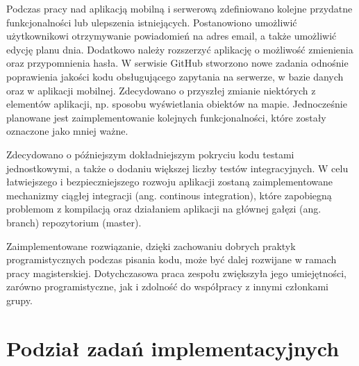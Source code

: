 \documentclass[10pt,twoside,a4paper]{report}
\begin{document}
\par Podczas pracy nad aplikacją mobilną i serwerową zdefiniowano kolejne przydatne funkcjonalności lub ulepszenia istniejących. Postanowiono umożliwić użytkownikowi otrzymywanie powiadomień na adres email, a także umożliwić edycję planu dnia. Dodatkowo należy rozszerzyć aplikację o możliwość zmienienia oraz przypomnienia hasła. W serwisie GitHub stworzono nowe zadania odnośnie poprawienia jakości kodu obsługującego zapytania na serwerze, w bazie danych oraz w aplikacji mobilnej. Zdecydowano o przyszłej zmianie niektórych z elementów aplikacji, np. sposobu wyświetlania obiektów na mapie. Jednocześnie planowane jest zaimplementowanie kolejnych funkcjonalności, które zostały oznaczone jako mniej ważne.

\par Zdecydowano o późniejszym dokładniejszym pokryciu kodu testami jednostkowymi, a także o dodaniu większej liczby testów integracyjnych. W celu łatwiejszego i bezpieczniejszego rozwoju aplikacji zostaną zaimplementowane mechanizmy ciągłej integracji (ang. continous integration), które zapobiegną problemom z kompilacją oraz działaniem aplikacji na głównej gałęzi (ang. branch) repozytorium (master).

\par Zaimplementowane rozwiązanie, dzięki zachowaniu dobrych praktyk programistycznych podczas pisania kodu, może być dalej rozwijane w ramach pracy magisterskiej. Dotychczasowa praca zespołu zwiększyła jego umiejętności, zarówno programistyczne, jak i zdolność do współpracy z innymi członkami grupy.

\chapter*{Podział zadań implementacyjnych}

\end{document}
